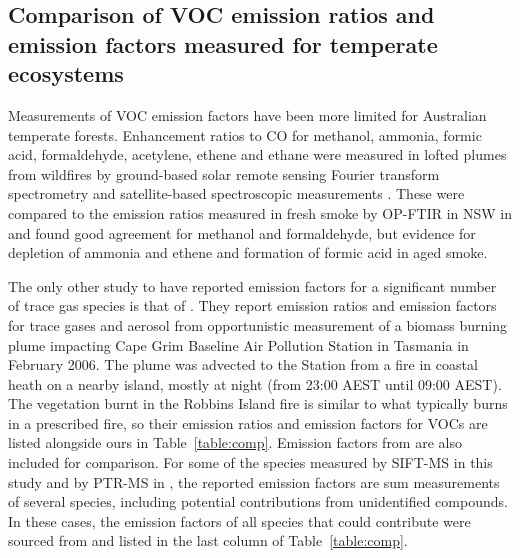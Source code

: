 \documentclass[acp, manuscript]{copernicus}
\begin{document}
\subsection{Comparison of VOC emission ratios and emission factors measured for temperate ecosystems}
Measurements of VOC emission factors have been more limited for Australian temperate forests. Enhancement ratios to CO for methanol, ammonia, formic acid, formaldehyde, acetylene, ethene and ethane were measured in lofted plumes from wildfires by ground-based solar remote sensing Fourier transform spectrometry \citep{Paton-Walsh2005, Paton-Walsh2008} and satellite-based spectroscopic measurements \citep{Young2011,Glatthor2013}. These were compared to the emission ratios measured in fresh smoke by OP-FTIR in NSW in \citet{Paton-Walsh2014} and found good agreement for methanol and formaldehyde, but evidence for depletion of ammonia and ethene and formation of formic acid in aged smoke. 
 
The only other study to have reported emission factors for a significant number of trace gas species is that of \citet{Lawson2015}. They report emission ratios and emission factors for trace gases and aerosol from opportunistic measurement of a biomass burning plume impacting Cape Grim Baseline Air Pollution Station in Tasmania in February 2006. The plume was advected to the Station from a fire in coastal heath on a nearby island, mostly at night (from 23:00 AEST until 09:00 AEST). The vegetation burnt in the Robbins Island fire is similar to what typically burns in a prescribed fire, so their emission ratios and emission factors for VOCs are listed alongside ours in Table~\ref{table:comp}. Emission factors from  \citet[Table S4, February 2015 update]{Akagi2011} are also included for comparison. For some of the species measured by SIFT-MS in this study and by PTR-MS in \citet{Lawson2015}, the reported emission factors are sum measurements of several species, including potential contributions from unidentified compounds. In these cases, the emission factors of all species that could contribute were sourced from \citet[Table S4, February 2015 update]{Akagi2011} and listed in the last column of Table~\ref{table:comp}. 
\end{document}
